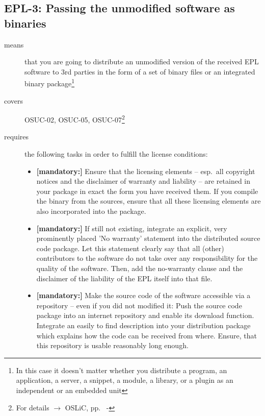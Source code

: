 \subsection{EPL-3: Passing the unmodified software as binaries} 

\begin{description}
\item[means] that you are going to distribute an unmodified version of the
received EPL software to 3rd parties in the form of a set of binary files or an
integrated bi\-na\-ry package\footnote{In this case it doesn't matter
whether you  distribute a program, an application, a server, a snippet, a
module, a library, or a plugin as an independent or an embedded unit}

\item[covers] OSUC-02, OSUC-05, OSUC-07\footnote{For details $\rightarrow$ OSLiC, pp.\
\pageref{OSUC-02-DEF} - \pageref{OSUC-07-DEF}}

\item[requires] the following tasks in order to fulfill the license conditions:
\begin{itemize}
  
  \item \textbf{[mandatory:]} Ensure that the licensing elements -- esp.\ all
  copyright notices and the disclaimer of warranty and liability -- are retained
  in your package in exact the form you have received them. If you compile the
  binary from the sources, ensure that all these licensing elements are also
  incorporated into the package.
  
  \item \textbf{[mandatory:]} If still not existing, integrate an explicit, very
  prominently placed 'No warranty' statement into the distributed source code
  package. Let this statement clearly say that all (other) contributors to the
  software do not take over any responsibility for the quality of the software.
  Then, add the no-warranty clause and the disclaimer of the liability of the
  EPL itself into that file.

  \item \textbf{[mandatory:]} Make the source code of the software accessible
  via a repository -- even if you did not modified it: Push the source code
  package into an internet repository and enable its download function.
  Integrate an easily to find description into your distribution package which
  explains how the code can be received from where. Ensure, that this repository
  is usable reasonably long enough.
  

\end{itemize}
\end{description}
